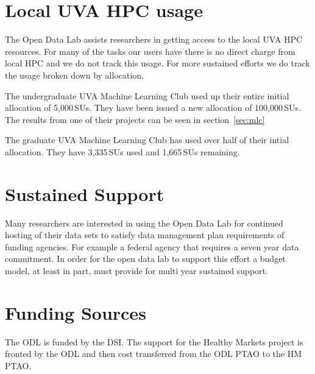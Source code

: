 \pagebreak
\section{Local UVA HPC usage}
The Open Data Lab assists researchers in getting access to the local UVA HPC resources. For many of the tasks our users have there is no direct charge from local HPC and we do not track this usage. For more sustained efforts we do track the usage broken down by allocation.

The undergraduate UVA Machine Learning Club used up their entire initial allocation of 5,000\,SUs. They have been issued a new allocation of 100,000\,SUs. The results from one of their projects can be seen in section~\ref{sec:mlc}

The graduate UVA Machine Learning Club has used over half of their intial allocation. They have 3,335\,SUs used and 1,665\,SUs remaining.

\section{Sustained Support}
Many researchers are interested in using the Open Data Lab for continued hosting of their data sets to satisfy data management plan requirements of funding agencies. For example a federal agency that requires a seven year data commitment. In order for the open data lab to support this effort a budget model, at least in part, must provide for multi year sustained support.

\section{Funding Sources}
The ODL is funded by the DSI. The support for the Healthy Markets project is fronted by the ODL and then  cost transferred from the ODL PTAO to the HM PTAO.











